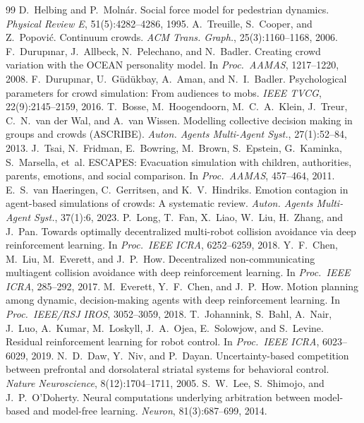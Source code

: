 \documentclass[sigconf,nonacm]{acmart}
\begin{document}
\begin{thebibliography}{99}
 D.~Helbing and P.~Moln\'ar. Social force model for pedestrian dynamics. \emph{Physical Review E}, 51(5):4282--4286, 1995.
 A.~Treuille, S.~Cooper, and Z.~Popovi\'c. Continuum crowds. \emph{ACM Trans. Graph.}, 25(3):1160--1168, 2006.
 F.~Durup\i nar, J.~Allbeck, N.~Pelechano, and N.~Badler. Creating crowd variation with the OCEAN personality model. In \emph{Proc.\ AAMAS}, 1217--1220, 2008.
 F.~Durup\i nar, U.~G\"ud\"ukbay, A.~Aman, and N.~I.~Badler. Psychological parameters for crowd simulation: From audiences to mobs. \emph{IEEE TVCG}, 22(9):2145--2159, 2016.
 T.~Bosse, M.~Hoogendoorn, M.~C.~A.~Klein, J.~Treur, C.~N.~van der Wal, and A.~van Wissen. Modelling collective decision making in groups and crowds (ASCRIBE). \emph{Auton. Agents Multi-Agent Syst.}, 27(1):52--84, 2013.
 J.~Tsai, N.~Fridman, E.~Bowring, M.~Brown, S.~Epstein, G.~Kaminka, S.~Marsella, et~al. ESCAPES: Evacuation simulation with children, authorities, parents, emotions, and social comparison. In \emph{Proc.\ AAMAS}, 457--464, 2011.
 E.~S.~van Haeringen, C.~Gerritsen, and K.~V.~Hindriks. Emotion contagion in agent-based simulations of crowds: A systematic review. \emph{Auton. Agents Multi-Agent Syst.}, 37(1):6, 2023.
 P.~Long, T.~Fan, X.~Liao, W.~Liu, H.~Zhang, and J.~Pan. Towards optimally decentralized multi-robot collision avoidance via deep reinforcement learning. In \emph{Proc.\ IEEE ICRA}, 6252--6259, 2018.
 Y.~F.~Chen, M.~Liu, M.~Everett, and J.~P.~How. Decentralized non-communicating multiagent collision avoidance with deep reinforcement learning. In \emph{Proc.\ IEEE ICRA}, 285--292, 2017.
 M.~Everett, Y.~F.~Chen, and J.~P.~How. Motion planning among dynamic, decision-making agents with deep reinforcement learning. In \emph{Proc.\ IEEE/RSJ IROS}, 3052--3059, 2018.
 T.~Johannink, S.~Bahl, A.~Nair, J.~Luo, A.~Kumar, M.~Loskyll, J.~A.~Ojea, E.~Solowjow, and S.~Levine. Residual reinforcement learning for robot control. In \emph{Proc.\ IEEE ICRA}, 6023--6029, 2019.
 N.~D.~Daw, Y.~Niv, and P.~Dayan. Uncertainty-based competition between prefrontal and dorsolateral striatal systems for behavioral control. \emph{Nature Neuroscience}, 8(12):1704--1711, 2005.
 S.~W.~Lee, S.~Shimojo, and J.~P.~O'Doherty. Neural computations underlying arbitration between model-based and model-free learning. \emph{Neuron}, 81(3):687--699, 2014.

\end{thebibliography}
\end{document}
